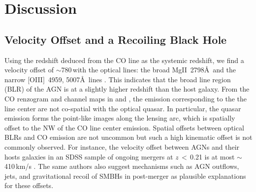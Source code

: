 \documentclass[]{emulateapj}
\begin{document}


\section{Discussion} \label{sec:diss}
\subsection{Velocity Offset and a Recoiling Black Hole}
Using the redshift deduced from the CO line 
as the systemic redshift, we find
a velocity offset of $\sim$780\,\kms with the optical lines:
the broad Mg{\scriptsize II}~2798\AA\ and the narrow 
$[$O{\scriptsize III}$]$~4959, 5007\AA\ lines \citep[$z_{\rm AGN} = 0.658$;][]{Sluse03a}.
This indicates that the broad line region (BLR) of the AGN is at a
slightly higher redshift than the host galaxy.
From the CO renzogram and channel maps in  and , the emission 
corresponding to the the line center are not co-spatial
with the optical quasar. In particular, the quasar emission forms 
the point-like images along the lensing arc, which is 
spatially offset to the NW
of the CO line center emission.
Spatial offsets between optical BLRs and CO emission are not uncommon
but such a high kinematic offset is not commonly observed.
For instance, the
velocity offset between AGNs and their hosts galaxies in 
an SDSS sample of ongoing mergers at $z$\,$<$\,0.21 is at most $\sim$410\,km/s \citep{Comerford14a}.
The same authors also suggest mechanisms
such as AGN outflows, jets, and gravitational recoil of SMBHs in post-merger
as plausible explanations for these offsets.
\end{document}
